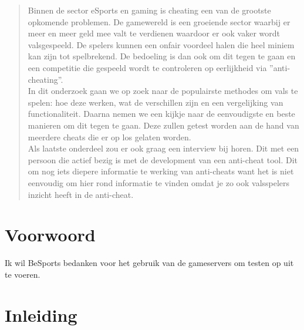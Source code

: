 \documentclass[pdftex,a4paper,12pt,twoside]{report}
\begin{document}
\begin{abstract}
Binnen de sector eSports en gaming is cheating een van de grootste opkomende problemen. De gamewereld is een groeiende sector waarbij er meer en meer geld mee valt te verdienen waardoor er ook vaker wordt valsgespeeld. De spelers kunnen een onfair voordeel halen die heel miniem kan zijn tot spelbrekend. De bedoeling is dan ook om dit tegen te gaan en een competitie die gespeeld wordt te controleren op eerlijkheid via ''anti-cheating''. 
\\

In dit onderzoek gaan we op zoek naar de populairste methodes om vals te spelen: hoe deze werken, wat de verschillen zijn en  een vergelijking van functionaliteit. 
Daarna nemen we een kijkje naar de eenvoudigste en beste manieren om dit tegen te gaan. Deze zullen getest worden aan de hand van meerdere cheats die er op los gelaten worden.
\\

Als laatste onderdeel zou er ook graag een interview bij horen. Dit met een persoon die actief bezig is met de development van een anti-cheat tool. Dit om nog iets diepere informatie te werking van anti-cheats want het is niet eenvoudig om hier rond informatie te vinden omdat je zo ook valsspelers inzicht heeft in de anti-cheat.
  
\end{abstract}

\chapter*{Voorwoord}
\label{ch:voorwoord}


Ik wil BeSports bedanken voor het gebruik van de gameservers om testen op uit te voeren. 

\tableofcontents



\chapter{Inleiding}
\label{ch:inleiding}
\end{document}
